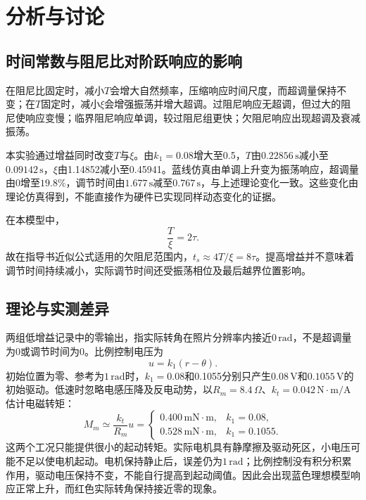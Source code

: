\documentclass[12pt]{article}
\newcommand{\unit}[1]{\,\mathrm{#1}}
\begin{document}
\section{分析与讨论}
\subsection{时间常数与阻尼比对阶跃响应的影响}
在阻尼比固定时，减小$T$会增大自然频率，压缩响应时间尺度，而超调量保持不变；在$T$固定时，减小$\xi$会增强振荡并增大超调。过阻尼响应无超调，但过大的阻尼使响应变慢；临界阻尼响应单调，较过阻尼组更快；欠阻尼响应出现超调及衰减振荡。

本实验通过增益同时改变$T$与$\xi$。由$k_1=0.08$增大至0.5，$T$由$0.22856\unit{s}$减小至$0.09142\unit{s}$，$\xi$由1.14852减小至0.45941。蓝线仿真由单调上升变为振荡响应，超调量由0增至$19.8\%$，调节时间由$1.677\unit{s}$减至$0.767\unit{s}$，与上述理论变化一致。这些变化由理论仿真得到，不能直接作为硬件已实现同样动态变化的证据。

在本模型中，
\begin{equation}
 \frac{T}{\xi}=2\tau.
\end{equation}
故在指导书近似公式适用的欠阻尼范围内，$t_s\approx4T/\xi=8\tau$。提高增益并不意味着调节时间持续减小，实际调节时间还受振荡相位及最后越界位置影响。

\subsection{理论与实测差异}
两组低增益记录中的零输出，指实际转角在照片分辨率内接近$0\unit{rad}$，不是超调量为0或调节时间为0。比例控制电压为
\begin{equation}
 u=k_1(r-\theta).
\end{equation}
初始位置为零、参考为$1\unit{rad}$时，$k_1=0.08$和0.1055分别只产生$0.08\unit{V}$和$0.1055\unit{V}$的初始驱动。低速时忽略电感压降及反电动势，以$R_m=8.4\,\Omega$、$k_t=0.042\unit{N\cdot m/A}$估计电磁转矩：
\begin{equation}
 M_m\simeq\frac{k_t}{R_m}u
 =\begin{cases}
 0.400\unit{mN\cdot m},&k_1=0.08,\\
 0.528\unit{mN\cdot m},&k_1=0.1055.
 \end{cases}
\end{equation}
这两个工况只能提供很小的起动转矩。实际电机具有静摩擦及驱动死区，小电压可能不足以使电机起动。电机保持静止后，误差仍为$1\unit{rad}$；比例控制没有积分积累作用，驱动电压保持不变，不能自行提高到起动阈值。因此会出现蓝色理想模型响应正常上升，而红色实际转角保持接近零的现象。
\end{document}
